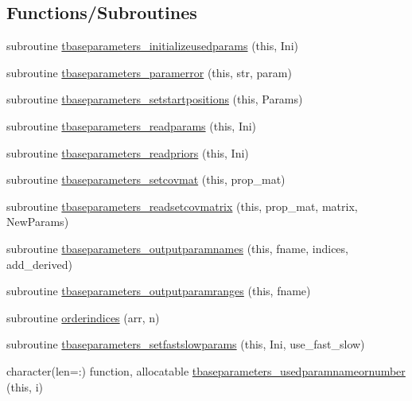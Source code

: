 \subsection*{Functions/\+Subroutines}
\begin{DoxyCompactItemize}
\item 
subroutine \mbox{\hyperlink{namespacebaseparameters_a86f36ece3b30fc7984f06ee4aad097bb}{tbaseparameters\+\_\+initializeusedparams}} (this, Ini)
\item 
subroutine \mbox{\hyperlink{namespacebaseparameters_a3126d9d902d7cc3f30105a9ad35e4a04}{tbaseparameters\+\_\+paramerror}} (this, str, param)
\item 
subroutine \mbox{\hyperlink{namespacebaseparameters_a1c41b4dbd4418bb1d16d77034504ac0b}{tbaseparameters\+\_\+setstartpositions}} (this, Params)
\item 
subroutine \mbox{\hyperlink{namespacebaseparameters_ae26154e8a07fc378e0e669659de1025a}{tbaseparameters\+\_\+readparams}} (this, Ini)
\item 
subroutine \mbox{\hyperlink{namespacebaseparameters_a810df98da76d4ae9691fb72eb588ea34}{tbaseparameters\+\_\+readpriors}} (this, Ini)
\item 
subroutine \mbox{\hyperlink{namespacebaseparameters_acc7b955531e3ac266fd197c8cc09ae50}{tbaseparameters\+\_\+setcovmat}} (this, prop\+\_\+mat)
\item 
subroutine \mbox{\hyperlink{namespacebaseparameters_a2d0a5594063e754beb3d8ef2b4af0522}{tbaseparameters\+\_\+readsetcovmatrix}} (this, prop\+\_\+mat, matrix, New\+Params)
\item 
subroutine \mbox{\hyperlink{namespacebaseparameters_a309e81ed0619c2b91456008b414cf5a9}{tbaseparameters\+\_\+outputparamnames}} (this, fname, indices, add\+\_\+derived)
\item 
subroutine \mbox{\hyperlink{namespacebaseparameters_a7deeecd73224be7473e92a6d48ba8909}{tbaseparameters\+\_\+outputparamranges}} (this, fname)
\item 
subroutine \mbox{\hyperlink{namespacebaseparameters_a7d00d4d42d3c3abcbdbc6078fffab95f}{orderindices}} (arr, n)
\item 
subroutine \mbox{\hyperlink{namespacebaseparameters_ac8f2cdce695f77b0f9cc3c2e86a9c05f}{tbaseparameters\+\_\+setfastslowparams}} (this, Ini, use\+\_\+fast\+\_\+slow)
\item 
character(len=\+:) function, allocatable \mbox{\hyperlink{namespacebaseparameters_a6fa6c72334203001f2e2932139df534d}{tbaseparameters\+\_\+usedparamnameornumber}} (this, i)
\end{DoxyCompactItemize}
